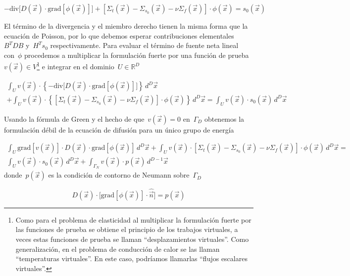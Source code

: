 \documentclass[
  12pt,
  a4paper,
  table]{scrbook}
\theoremstyle{plain}
\theoremstyle{definition}
\theoremstyle{plain}
\theoremstyle{plain}
\theoremstyle{remark}
\begin{document}
\[
 - \text{div} \Big[ D(\vec{x}) \cdot \text{grad} \left[ \phi(\vec{x}) \right] \Big]
 + \left[\Sigma_{t}(\vec{x})  - \Sigma_{s_0}(\vec{x}) - \nu\Sigma_{f}(\vec{x}) \right]\cdot \phi(\vec{x})
= s_{0}(\vec{x})
\]

El término de la divergencia y el miembro derecho tienen la misma forma
que la ecuación de Poisson, por lo que debemos esperar contribuciones
elementales~\(B^T D B\) y~\(H^T s_0\) respectivamente. Para evaluar el
término de fuente neta lineal con~\(\phi\) procedemos a multiplicar la
formulación fuerte por una función de
prueba~\(v(\vec{x}) \in V\)\footnote{Como para el problema de
  elasticidad al multiplicar la formulación fuerte por las funciones de
  prueba se obtiene el principio de los trabajos virtuales, a veces
  estas funciones de prueba se llaman ``desplazamientos virtuales''.
  Como generalización, en el problema de conducción de calor se las
  llaman ``temperaturas virtuales''. En este caso, podríamos llamarlas
  ``flujos escalares virtuales''.} e integrar en el
dominio~\(U\in\mathbb{R}^D\)

\[
\begin{gathered}
\int_U v(\vec{x}) \cdot \left\{ - \text{div} \Big[ D(\vec{x}) \cdot \text{grad} \left[ \phi(\vec{x}) \right] \Big] \right\} \, d^D\vec{x} \\
 + \int_U v(\vec{x}) \cdot \left\{ \left[\Sigma_{t}(\vec{x})  - \Sigma_{s_0}(\vec{x}) - \nu\Sigma_{f}(\vec{x}) \right] \cdot \phi(\vec{x}) \right\} \, d^D\vec{x}
= \int_U v(\vec{x}) \cdot s_{0}(\vec{x}) \, d^D\vec{x}
\end{gathered}
\]

Usando la fórmula de Green y el hecho de que~\(v(\vec{x})=0\)
en~\(\Gamma_D\) obtenemos la formulación débil de la ecuación de
difusión para un único grupo de energía

\[
\begin{gathered}
\int_U \text{grad} \left[ v(\vec{x}) \right] \cdot D(\vec{x}) \cdot \text{grad} \left[ \phi(\vec{x}) \right]  \,d^D\vec{x}
+ \int_U v(\vec{x}) \cdot \left[\Sigma_{t}(\vec{x})  - \Sigma_{s_0}(\vec{x}) - \nu\Sigma_{f}(\vec{x}) \right] \cdot \phi(\vec{x}) \,d^D\vec{x}
= \\
\int_U v(\vec{x}) \cdot s_0(\vec{x}) \,d^D\vec{x}
+ \int_{\Gamma_N} v(\vec{x}) \cdot p(\vec{x}) \,d^{D-1}\vec{x}
\end{gathered}
\] donde~\(p(\vec{x})\) es la condición de contorno de Neumann
sobre~\(\Gamma_D\)

\[
D(\vec{x}) \cdot \Big[ \text{grad} \left[ \phi(\vec{x}) \right] \cdot \hat{\vec{n}} \Big] = p(\vec{x})
\]
\end{document}
